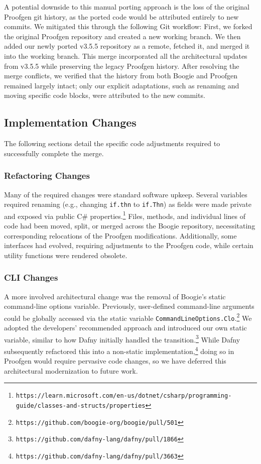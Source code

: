 \documentclass[11pt]{article}
\begin{document}
A potential downside to this manual porting approach is the loss of the original Proofgen git history,
as the ported code would be attributed entirely to new commits.
We mitigated this through the following Git workflow:
First, we forked the original Proofgen repository and created a new working branch.
We then added our newly ported v3.5.5 repository as a remote, fetched it, and merged it into the working branch.
This merge incorporated all the architectural updates from v3.5.5 while preserving the legacy Proofgen history.
After resolving the merge conflicts, we verified that the history from both Boogie and Proofgen remained largely intact;
only our explicit adaptations, such as renaming and moving specific code blocks, were attributed to the new commits.

\subsection{Implementation Changes}

The following sections detail the specific code adjustments required to successfully complete the merge.

\subsubsection{Refactoring Changes}

Many of the required changes were standard software upkeep.
Several variables required renaming (e.g., changing \texttt{if.thn} to \texttt{if.Thn})
as fields were made private and exposed via public C\# properties.\footnote{\texttt{https://learn.microsoft.com/en-us/dotnet/csharp/programming-guide/classes-and-structs/properties}}
Files, methods, and individual lines of code had been moved, split, or merged across the Boogie repository,
necessitating corresponding relocations of the Proofgen modifications.
Additionally, some interfaces had evolved, requiring adjustments to the Proofgen code, while certain utility functions were rendered obsolete.

\subsubsection{CLI Changes}

A more involved architectural change was the removal of Boogie's static command-line options variable.
Previously, user-defined command-line arguments could be globally accessed via the static variable \texttt{CommandLineOptions.Clo}.\footnote{\texttt{https://github.com/boogie-org/boogie/pull/501}}
We adopted the developers' recommended approach and introduced our own static variable, similar to how Dafny initially handled the transition.\footnote{\texttt{https://github.com/dafny-lang/dafny/pull/1866}}
While Dafny subsequently refactored this into a non-static implementation,\footnote{\texttt{https://github.com/dafny-lang/dafny/pull/3663}}
doing so in Proofgen would require pervasive code changes,
so we have deferred this architectural modernization to future work.
\end{document}
